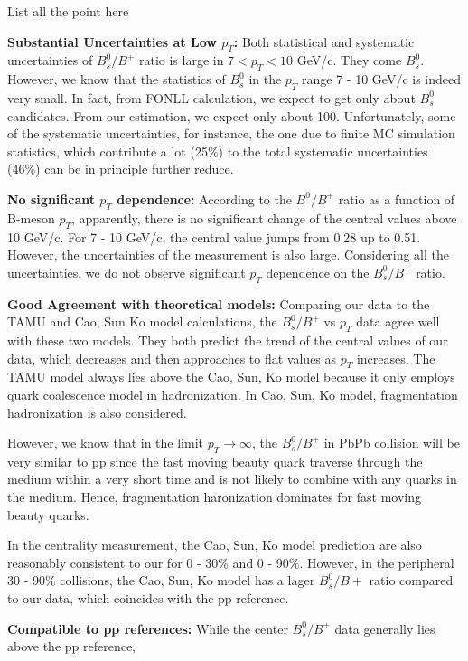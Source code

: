 List all the point here

\textbf{Substantial Uncertainties at Low $p_T$:} Both statistical and systematic uncertainties of $B^0_s/B^+$ ratio is large in $7 < p_T < 10$ GeV/c. They come $B^0_s$. However, we know that the statistics of $B^0_s$ in the $p_T$ range 7 - 10 GeV/c is indeed very small. In fact, from FONLL calculation, we expect to get only about $B^0_s$ candidates. From our estimation, we expect only about 100. Unfortunately, some of the systematic uncertainties, for instance, the one due to finite MC simulation statistics, which contribute a lot (25\%) to the total systematic uncertainties (46\%) can be in principle further reduce. 

\textbf{No significant $p_T$ dependence:} According to the $B^0/B^+$ ratio as a function of B-meson $p_T$, apparently, there is no significant change of the central values above 10 GeV/c. For 7 - 10 GeV/c, the central value jumps from 0.28 up to 0.51. However, the uncertainties of the measurement is also large. Considering all the uncertainties, we do not observe significant $p_T$ dependence on the $B^0_s/B^+$ ratio.

\textbf{Good Agreement with theoretical models:} Comparing our data to the TAMU and Cao, Sun Ko model calculations, the $B^0_s/B^+$ vs $p_T$ data agree well with these two models. They both predict the trend of the central values of our data, which decreases and then approaches to flat values as $p_T$ increases. The TAMU model always lies above the Cao, Sun, Ko model because it only employs quark coalescence model in hadronization. In Cao, Sun, Ko model, fragmentation hadronization is also considered. 

However, we know that in the limit $p_T \rightarrow \infty$, the $B^0_s/B^+$ in PbPb collision will be very similar to pp since the fast moving beauty quark traverse through the medium within a very short time and is not likely to combine with any quarks in the medium. Hence, fragmentation haronization dominates for fast moving beauty quarks. 

In the centrality measurement, the Cao, Sun, Ko model prediction are also reasonably consistent to our for 0 - 30\% and 0 - 90\%. However, in the peripheral 30 - 90\% collisions, the Cao, Sun, Ko model has a lager $B^0_s/B+$ ratio compared to our data, which coincides with the pp reference.  


\textbf{Compatible to pp references:} While the center $B^0_s/B^+$ data generally lies above the pp reference, 
 

